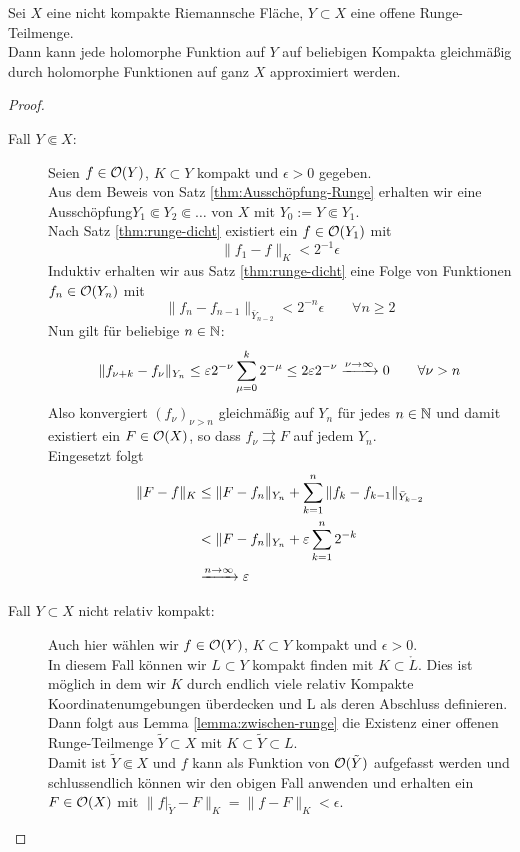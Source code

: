 \begin{thm}
  Sei $X$ eine nicht kompakte Riemannsche Fläche, $Y \subset X$ eine
  offene Runge-Teilmenge. \\
  Dann kann jede holomorphe Funktion auf $Y$ auf beliebigen Kompakta
  gleichmäßig durch holomorphe Funktionen auf ganz $X$ approximiert werden.
\end{thm}

\begin{proof}
  \begin{description}
  \item[Fall $Y \Subset X$:] Seien $f \in \mathcal{O}(Y)$, $K \subset Y$
    kompakt und $\epsilon > 0$ gegeben. \\
    Aus dem Beweis von Satz \ref{thm:Ausschöpfung-Runge} erhalten wir
    eine Ausschöpfung$Y_1
    \Subset Y_2 \Subset \dots$ von $X$ mit $Y_0 := Y \Subset Y_1$. \\
    Nach Satz \ref{thm:runge-dicht} existiert ein $f \in \mathcal{O}(Y_1)$
    mit
    \[
    \|f_1 - f\|_K < 2^{-1} \epsilon
    \]
    Induktiv erhalten wir aus Satz \ref{thm:runge-dicht} eine Folge
    von Funktionen $f_n \in \mathcal{O}(Y_n)$ mit
    \[
    \|f_n - f_{n-1}\|_{\bar Y_{n-2}} < 2^{-n} \epsilon \qquad \forall
    n \geq 2
    \]
    Nun gilt für beliebige $n \in \mathbb{N}$:
    \[
    \|f_{\nu + k} - f_{\nu} \|_{Y_n} \leq \varepsilon 2^{-\nu} \sum_{\mu
      = 0}^k 2^{-\mu} \leq 2 \varepsilon 2^{-\nu} \xrightarrow{\nu \rightarrow
      \infty} 0 \qquad \forall \nu > n
    \]
    Also konvergiert $(f_\nu)_{\nu > n}$ gleichmäßig auf $Y_n$ für
    jedes $n \in \mathbb{N}$ und damit existiert ein $F \in \mathcal{O}(X)$, so dass
    $f_\nu \rightrightarrows F$ auf jedem $Y_n$. \\
    Eingesetzt folgt
    \begin{align*}
      \|F - f\|_K & \leq \|F - f_n\|_{Y_n} + \sum_{k=1}^n \|f_k -
      f_{k-1}\|_{\bar Y_{k-2}} \\
      & < \|F - f_n \|_{Y_n} + \varepsilon \sum_{k=1}^n 2^{-k} \\
      & \xrightarrow{n \rightarrow \infty} \varepsilon
    \end{align*}
  \item[Fall $Y \subset X$ nicht relativ kompakt:] Auch hier wählen
    wir $f \in \mathcal{O}(Y)$, $K \subset Y$ kompakt und $\epsilon > 0$. \\
    In diesem Fall können wir $L \subset Y$ kompakt finden mit $K \subset
    \mathring L$. Dies ist möglich in dem wir $K$ durch endlich viele relativ
    Kompakte Koordinatenumgebungen überdecken und L als deren
    Abschluss definieren. \\
    Dann folgt aus Lemma \ref{lemma:zwischen-runge} die Existenz einer
    offenen Runge-Teilmenge
    $\tilde Y \subset X$ mit $K \subset \tilde Y \subset L$. \\
    Damit ist $\tilde Y \Subset X$ und $f$ kann als Funktion von
    $\mathcal{O}(\tilde Y)$ aufgefasst werden und schlussendlich können wir
    den obigen Fall anwenden und erhalten ein $F \in \mathcal{O}(X)$ mit
    $\|f|_{\tilde Y} - F\|_K = \|f - F\|_K < \epsilon$.
  \end{description}
\end{proof}

